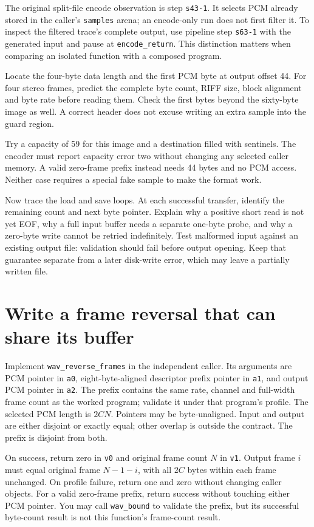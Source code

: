 The original split-file encode observation is step \texttt{s43-1}. It selects PCM already
stored in the caller's \texttt{samples} arena; an encode-only run does not first
filter it. To inspect the filtered trace's complete output, use pipeline step
\texttt{s63-1} with the generated input and pause at \texttt{encode\_return}.
This distinction matters when comparing an isolated function with a composed
program.

Locate the four-byte data length and the first PCM byte at output offset 44.
For four stereo frames, predict the complete byte count, RIFF size, block
alignment and byte rate before reading them. Check the first bytes beyond the
sixty-byte image as well. A correct header does not excuse writing an extra
sample into the guard region.

Try a capacity of 59 for this image and a destination filled with sentinels.
The encoder must report capacity error two without changing any selected
caller memory. A valid zero-frame prefix instead needs 44 bytes and no PCM
access. Neither case requires a special fake sample to make the format work.

Now trace the load and save loops. At each successful transfer, identify the
remaining count and next byte pointer. Explain why a positive short read is
not yet EOF, why a full input buffer needs a separate one-byte probe, and why
a zero-byte write cannot be retried indefinitely. Test malformed input against
an existing output file: validation should fail before output opening. Keep
that guarantee separate from a later disk-write error, which may leave a
partially written file.

\section{Write a frame reversal that can share its buffer}

Implement \texttt{wav\_reverse\_frames} in the independent caller. Its arguments
are PCM pointer in \texttt{a0}, eight-byte-aligned descriptor prefix pointer in
\texttt{a1}, and output PCM pointer in \texttt{a2}. The prefix contains the
same rate, channel and full-width frame count as the worked program; validate
it under that program's profile. The selected PCM length is $2CN$. Pointers
may be byte-unaligned. Input and output are either disjoint or exactly equal;
other overlap is outside the contract. The prefix is disjoint from both.

On success, return zero in \texttt{v0} and original frame count $N$ in
\texttt{v1}. Output frame $i$ must equal original frame $N-1-i$, with all
$2C$ bytes within each frame unchanged. On profile failure, return one and zero
without changing caller objects. For a valid zero-frame prefix, return success
without touching either PCM pointer. You may call \texttt{wav\_bound} to
validate the prefix, but its successful byte-count result is not this function's
frame-count result.

